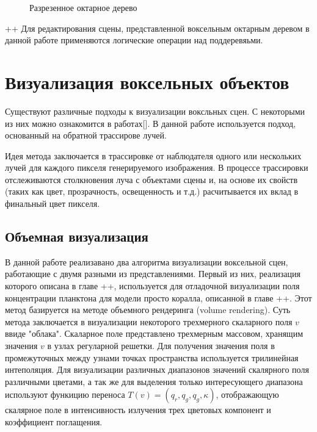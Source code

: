 \begin{figure}[h]
  \begin{center}
  \end{center}
  \caption{Разрезенное октарное дерево}
  \label{fig:svo}
\end{figure}

++ Для редактирования сцены, представленной воксельным октарным деревом в данной работе применяются логические операции над поддеревяьми.

\section{Визуализация воксельных объектов}

Существуют различные подходы к визуализации воксльных сцен.  С некоторыми из них можно ознакомится в работах[]. В данной работе используется подход, основанный на обратной трассирове лучей.

Идея метода заключается в трассировке от наблюдателя одного или нескольких лучей для каждого пикселя генерируемого изображения. В процессе трассировки отслеживаются столкновения луча с объектами сцены и, на основе их свойств (таких как цвет, прозрачность, освещенность и т.д.)  расчитывается их вклад в финальный цвет пикселя.

\subsection{Объемная визуализация}

В данной работе реализавано два алгоритма визуализации воксельной сцен, работающие с двумя разными из представлениями. Первый из них, реализация которого описана в главе ++, используется для отладочной визуализации поля концентрации планктона для модели просто коралла, описанной в главе ++. Этот метод базируется на методе объемного рендеринга (volume rendering). Суть метода заключается в визуализации некоторого трехмерного скаларного поля $v$ ввиде "облака". Скаларное поле представлено трехмерным массовом, хранящим значения $v$ в узлах регуларной решетки. Для получения значения поля в промежуточных между узнами точках пространства используется трилинейная интеполяция. Для визуализации различных диапазонов значений скалярного поля различными цветами, а так же для выделения только интересующего диапазона используют функицию переноса $T(v) = (q_r, q_g, q_g, \kappa)$, отображающую скалярное поле в интенсивность излучения трех цветовых компонент и коэффициент поглащения.

